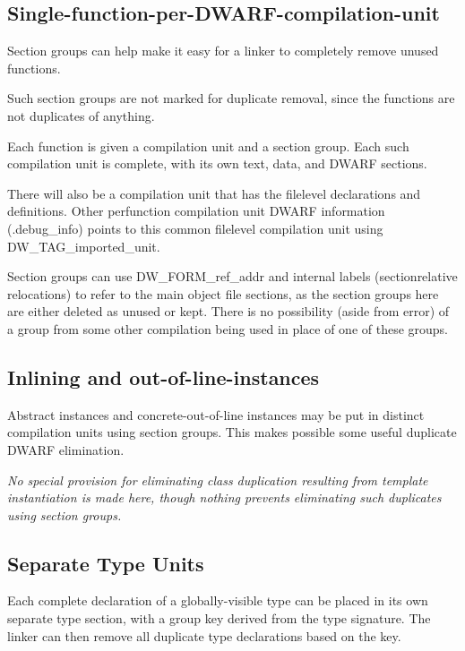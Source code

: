 \subsection{Single-function-per-DWARF-compilation-unit}
\label{app:singlefunctionperdwarfcompilationunit}

Section groups can help make it easy for a linker to completely
remove unused functions.

Such section groups are not marked for duplicate removal,
since the functions are not duplicates of anything.

Each function is given a compilation unit and a section
group. Each such compilation unit is complete, with its own
text, data, and DWARF sections.

There will also be a compilation unit that has the file\dash level
declarations and definitions. Other per\dash function compilation
unit DWARF information (.debug\_info) points to this common
file\dash level compilation unit using DW\_TAG\_imported\_unit.

Section groups can use DW\_FORM\_ref\_addr and internal labels
(section\dash relative relocations) to refer to the main object
file sections, as the section groups here are either deleted
as unused or kept. There is no possibility (aside from error)
of a group from some other compilation being used in place
of one of these groups.


\subsection{Inlining and out-of-line-instances}
\label{app:inliningandoutoflineinstances}

Abstract instances and concrete-out-of-line instances may be
put in distinct compilation units using section groups. This
makes possible some useful duplicate DWARF elimination.

\textit{No special provision for eliminating class duplication
resulting from template instantiation is made here, though
nothing prevents eliminating such duplicates using section
groups.}


\subsection{Separate Type Units}
\label{app:separatetypeunits}

Each complete declaration of a globally-visible type can be
placed in its own separate type section, with a group key
derived from the type signature. The linker can then remove
all duplicate type declarations based on the key.

